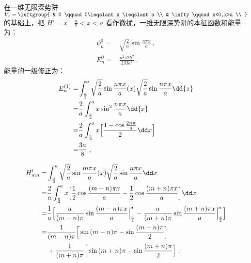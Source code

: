 \subsection{ }
在一维无限深势阱 $V_{x} = \leftgroup{
    & 0 \qquad 0\leqslant x \leqslant a \\
    & \infty \qquad x<0,x>a \\
}$ 的基础上，把 $H' = x \quad \frac{a}{2} < x < a $ 看作微扰，一维无限深势阱的本征函数和能量为：\\
\begin{equation}
\begin{aligned}
\psi^{0}_{n}=& \sqrt{\frac{2}{a}} \sin{\frac{n\pi x}{a}}~,\\
E^{0}_{n}=& \frac{n^{2}\pi{2}\hbar^{2}}{2Ma^2}~.
\end{aligned}
\end{equation}
能量的一级修正为：\\
\begin{equation}
\begin{aligned}
E^{(1)}_{n}=&\int^{a}_{\frac{a}{2}} \sqrt{\frac{2}{a}} \sin{\frac{n\pi x}{a}}(x)\sqrt{\frac{2}{a}} \sin{\frac{n\pi x}{a}} \dd{x} \\
=& \frac{2}{a} \int^{a}_{\frac{a}{2}} x\sin^{2}{\frac{n\pi x}{a}} \dd{x} \\
=& \frac{2}{a}\int^{a}_{\frac{a}{2}} x\Bigl[\frac{1-\cos{\frac{2n \pi}{a}}}{2}\dd x\Bigr] \\
=& \frac{3a}{8}~,
\end{aligned}
\end{equation}

\begin{equation}
\begin{aligned}
H'_{mn} =& \int^{a}_{\frac{a}{2}} \sqrt{\frac{2}{a}} \sin{\frac{m \pi x}{a}} (x) \sqrt{\frac{2}{a} }\sin{\frac{n \pi x}{a}} \dd x \\
=& \frac{2}{a} \int^{a}_{\frac{a}{2}} x\Bigl[\frac{1}{2} \cos{\frac{(m-n)\pi x}{a}} - \frac{1}{2} \cos{\frac{(m+n) \pi x}{a}}\Bigr] \dd x \\
=& \frac{1}{a} \Bigl[\frac{a}{(m-n)\pi} \sin{\frac{(m-n)\pi x}{a}}\Big|^{a}_{\frac{a}{2}} - \frac{a}{(m+n)\pi} \sin{\frac{(m+n)\pi x}{a}}\Big|^{a}_{\frac{a}{2}}\Bigr] \\
=& \frac{1}{(m-n)\pi} \Big[\sin{(m-n)\pi} - \sin{\frac{(m-n)\pi}{2}}\Big]\\
&+\frac{1}{(m+n)\pi} \Big[\sin{(m+n)\pi} -\sin{\frac{(m+n)\pi}{2}} \Big]~.
\end{aligned}
\end{equation}

